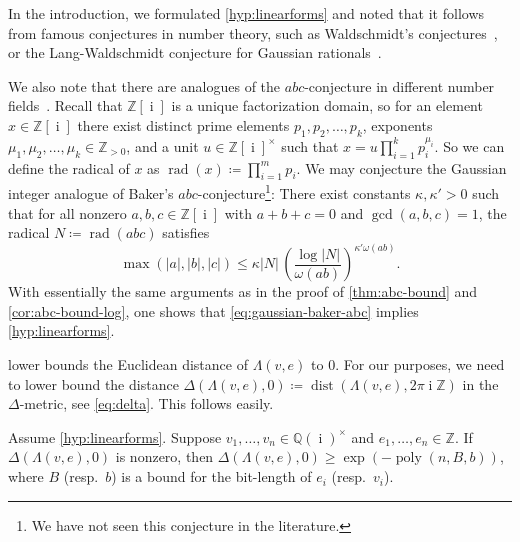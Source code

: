 \documentclass[a4paper,USenglish,cleveref,numberwithinsect]{lipics-v2021}
\DeclareMathOperator{\poly}{poly}
\DeclareMathOperator{\rad}{rad}
\DeclareMathOperator{\ii}{i}
\DeclareMathOperator{\dist}{dist}
\newcommand{\QQ}{\mathbb{Q}}
\newcommand{\ZZ}{\mathbb{Z}}
\numberwithin{equation}{section}
\begin{document}
In the introduction, we formulated \cref{hyp:linearforms} and noted that it follows
from famous conjectures in number theory, such as
Waldschmidt's conjectures~\cite[Conjecture~14.25]{waldschmidt-2},~\cite[Conjecture~4.14]{waldschmidt-1}
or the Lang-Waldschmidt conjecture
for Gaussian rationals~\cite[Introduction to Chapters X and XI]{lang-elliptic-curves}.

We also note that there are analogues of the $abc$-conjecture in different number fields~\cite{bombieri_gubler_2006}.
Recall that $\ZZ[\ii]$ is a unique factorization domain,
so for an element $x\in\ZZ[\ii]$
there exist distinct prime elements $p_1,p_2,\dots,p_k$,
exponents $\mu_1,\mu_2,\dots,\mu_k\in\ZZ_{>0}$,
and a unit $u\in\ZZ[\ii]^\times$ such that
$x = u \prod_{i=1}^k p_i^{\mu_i}$.
So we can define the radical of $x$ as $\rad(x)\coloneqq \prod_{i=1}^m p_i$.
We may conjecture the Gaussian integer analogue of Baker's $abc$-conjecture\footnote{We have not seen this conjecture in the literature.}:
There exist constants $\kappa,\kappa'>0$ such that for all nonzero
$a,b,c\in\ZZ[\ii]$ with $a+b+c=0$ and $\gcd(a,b,c)=1$,
the radical $N\coloneqq\rad(abc)$ satisfies
\begin{equation}\label{eq:gaussian-baker-abc}
	\max (|a|, |b|, |c|) \leq \kappa |N| \, \left(\frac{\log |N|}{\omega(ab)}\right)^{\kappa' \omega(ab)}.
\end{equation}
With essentially the same arguments as in the proof of \cref{thm:abc-bound}
and \cref{cor:abc-bound-log},
one shows that \cref{eq:gaussian-baker-abc}
implies \cref{hyp:linearforms}.

 lower bounds the Euclidean distance of $\Lambda(v,e)$ to $0$.
For our purposes, we need to lower bound the distance
$\Delta( \Lambda(v,e) , 0 )\coloneqq \dist( \Lambda(v,e), 2\pi\ii\ZZ )$
in the $\Delta$-metric, see \cref{eq:delta}.
This follows easily.

\begin{proposition}
\label{cor:hyp-in-delta-metric}
Assume \cref{hyp:linearforms}.
Suppose $v_1,\dots,v_n\in\QQ(\ii)^\times$
and $e_1,\dots,e_n\in\ZZ$.
If $\Delta( \Lambda(v,e),0)$ is nonzero, then
$\Delta( \Lambda(v,e) , 0 ) \geq \exp(-\poly(n,B,b))$,
where $B$ (resp.~$b$) is a bound for the bit-length of $e_i$ (resp.~$v_i$).
\end{proposition}
\end{document}
